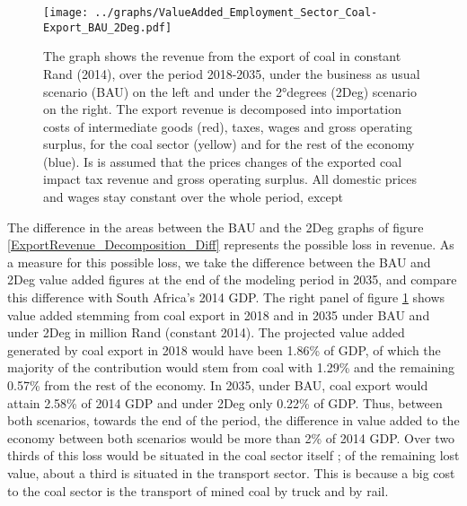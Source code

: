 \documentclass[12pt,english]{article}
\begin{document}
\begin{figure}[!t]
	\centering
	\hspace{-10pt}\texttt{[image: ../graphs/ValueAdded\_Employment\_Sector\_Coal-Export\_BAU\_2Deg.pdf]}
	\caption{\label{ValueAdded_Employment_Sector_Coal-Export_BAU_2Deg}\small The graph shows the revenue from the export of coal in constant Rand (2014), over the period 2018-2035, under the business as usual scenario (BAU) on the left and under the 2°degrees (2Deg) scenario on the right. The export revenue is decomposed into importation costs of intermediate goods (red), taxes, wages and gross operating surplus, for the coal sector (yellow) and for the rest of the economy (blue). Is is assumed that the prices changes of the exported coal impact tax revenue and gross operating surplus. All domestic prices and wages stay constant over the whole period, except  }
\end{figure}

The difference in the areas between the BAU and the 2Deg graphs of figure \ref{ExportRevenue_Decomposition_Diff} represents the possible loss in revenue. As a measure for this possible loss, we take the difference between the BAU and 2Deg value added figures at the end of the modeling period in 2035, and compare this difference with South Africa's 2014 GDP. %
The right panel of figure \ref{ValueAdded_Employment_Sector_Coal-Export_BAU_2Deg} shows value added stemming from coal export in 2018 and in 2035 under BAU and under 2Deg in million Rand (constant 2014). %
The projected value added generated by coal export in 2018 would have been 1.86\% of GDP, of which the majority of the contribution would stem from coal with 1.29\% and the remaining 0.57\% from the rest of the economy. In 2035, under BAU, coal export would attain 2.58\% of 2014 GDP and under 2Deg only 0.22\% of GDP. Thus, between both scenarios, towards the end of the period, the difference in value added to the economy between both scenarios would be more than 2\% of 2014 GDP. Over two thirds of this loss would be situated in the coal sector itself ; of the remaining lost value, about a third is situated in the transport sector. This is because a big cost to the coal sector is the transport of mined coal by truck and by rail. 
\end{document}
